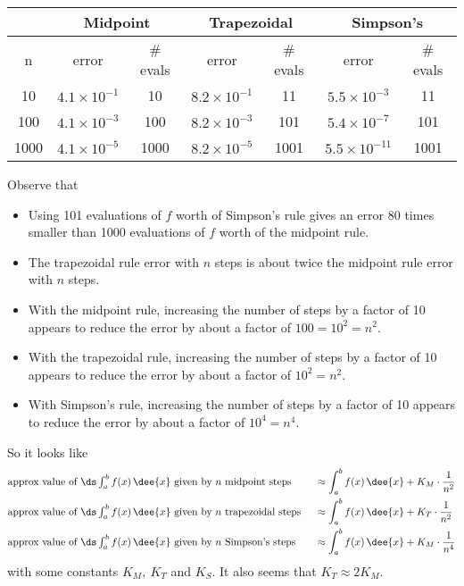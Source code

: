 \renewcommand{\arraystretch}{1.1}
\begin{center}
     \begin{tabular}{|c|c|c|c|c|c|c|}
          \hline
          & \multicolumn{2}{|c|}{\textbf{Midpoint}}&
            \multicolumn{2}{|c|}{\textbf{Trapezoidal}}&
            \multicolumn{2}{|c|}{\textbf{Simpson's}}\\          \hline
          n & error & \#  evals & error & \#  evals
                & error & \# evals \\
          \hline
          10 & $4.1\times 10^{-1}$ & 10 & $8.2\times 10^{-1}$ & 11 &
                  $5.5\times 10^{-3}$ & 11 \\
          100 & $4.1\times 10^{-3}$ & 100 & $8.2\times 10^{-3}$ & 101 &
                  $5.4\times 10^{-7}$ & 101 \\
          1000 & $4.1\times 10^{-5}$ & 1000 & $8.2\times 10^{-5}$ & 1001 &
                  $5.5\times 10^{-11}$ & 1001 \\
          \hline
     \end{tabular}
\end{center}
\renewcommand{\arraystretch}{1.0}


\noindent Observe that
\begin{itemize}
\item
   Using 101 evaluations of $f$ worth of Simpson's rule gives
   an error 80 times smaller than 1000 evaluations of $f$ worth
   of the midpoint rule.
\item
   The trapezoidal rule error with $n$ steps is about twice
   the midpoint rule  error with $n$ steps.
\item
    With the midpoint rule, increasing the number of steps
   by a factor of 10 appears to reduce the error by about a factor of
   $100=10^2=n^2$.
\item
  With the trapezoidal rule, increasing the number of steps
 by a factor of 10 appears to reduce the error by about a factor of $10^2=n^2$.
\item
   With Simpson's rule, increasing the number of steps
 by a factor of 10 appears to reduce the error by about a factor of $10^4=n^4$.
\end{itemize}

\noindent So it looks like
\begin{alignat*}{3}
&\hbox{approx value of $\ds\int_a^b f(x)\,\dee{x}$ given by $n$ midpoint steps  }
&&\approx \int_a^b f(x)\,\dee{x}+K_M\cdot \frac{1}{n^2}\\
%
&\hbox{approx value of $\ds\int_a^b f(x)\,\dee{x}$ given by $n$ trapezoidal steps  }
&&\approx  \int_a^b f(x)\,\dee{x}+K_T\cdot \frac{1}{n^2}\\
%
&\hbox{approx value of $\ds\int_a^b f(x)\,\dee{x}$ given by $n$ Simpson's steps  }
&&\approx  \int_a^b f(x)\,\dee{x}+K_M\cdot \frac{1}{n^4}
\end{alignat*}
with some constants $K_M,\ K_T$ and $K_S$. It also seems that $K_T\approx
2 K_M$.

